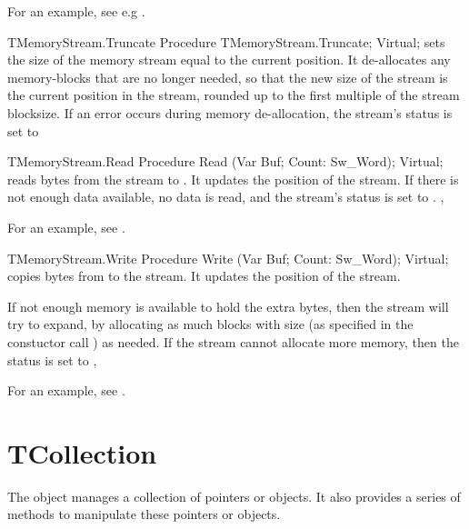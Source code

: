For an example, see e.g .

\begin{procedure}{TMemoryStream.Truncate}
\Declaration
Procedure TMemoryStream.Truncate; Virtual;
\Description
{} sets the size of the memory stream equal to the current
position. It de-allocates any memory-blocks that are no longer needed, so
that the new size of the stream is the current position in the stream,
rounded up to the first multiple of the stream blocksize.
\Errors 
If an error occurs during memory de-allocation, the stream's status is set
to 
\SeeAlso
{}
\end{procedure}



\begin{procedure}{TMemoryStream.Read}
\Declaration
Procedure Read (Var Buf; Count: Sw\_Word); Virtual;
\Description
{} reads  bytes from the stream to . It updates
the position of the stream.
\Errors
If there is not enough data available, no data is read, and the stream's
status is set to .
\SeeAlso
{}, 
\end{procedure}

For an example, see .

\begin{procedure}{TMemoryStream.Write}
\Declaration
Procedure Write (Var Buf; Count: Sw\_Word); Virtual;
\Description
{} copies  bytes from  to the stream. It
updates the position of the stream. 

If not enough memory is available to hold the extra  bytes, 
then the stream will try to expand, by allocating as much blocks with 
size  (as specified in the constuctor call
) as needed. 
\Errors
If the stream cannot allocate more memory, then the status is set to
\SeeAlso
{}, 
\end{procedure}

For an example, see .

\section{TCollection}
\label{se:TCollection}

The  object manages a collection of pointers or objects. 
It also provides a series of methods to manipulate these pointers or 
objects.

